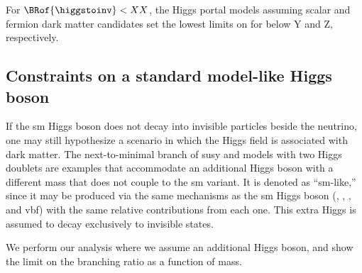 For $\BRof{\higgstoinv} < XX$, the Higgs portal models assuming scalar and fermion dark matter candidates set the lowest limits on \xsecSI for \mqdark below Y and Z\GeV, respectively.





\subsection{Constraints on a standard model-like Higgs boson}
\label{subsec:htoinv_dark_matter_bsm_higgs}

If the \acrshort{sm} Higgs boson does not decay into invisible particles beside the neutrino, one may still hypothesize a scenario in which the Higgs field is associated with dark matter. The next-to-minimal branch of \acrlong{susy} and models with two Higgs doublets are examples that accommodate an additional Higgs boson with a different mass that does not couple to the \acrshort{sm} variant. It is denoted as ``\acrlong{sm}-like,'' since it may be produced via the same mechanisms as the \acrshort{sm} Higgs boson (\ttH, \VH, \ggH, and \acrshort{vbf}) with the same relative contributions from each one. This extra Higgs is assumed to decay exclusively to invisible states.

We perform our analysis where we assume an additional Higgs boson, and show the limit on the branching ratio as a function of mass.

